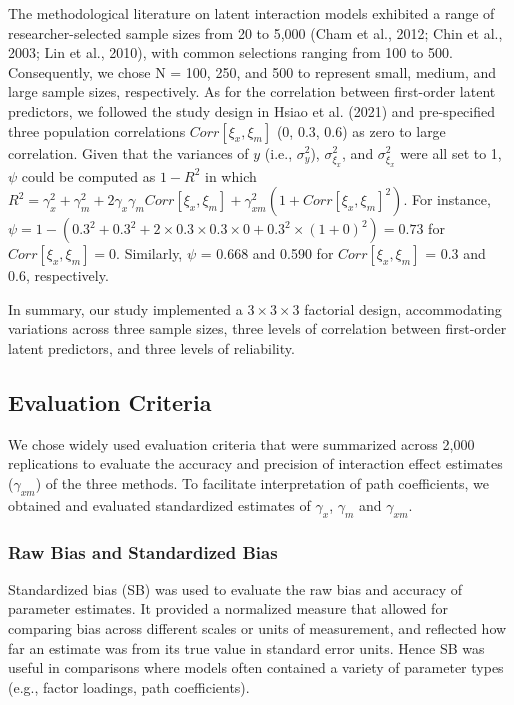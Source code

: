 \documentclass[
  man]{apa6}
\begin{document}
The methodological literature on latent interaction models exhibited a range of researcher-selected sample sizes from 20 to 5,000 (Cham et al., 2012; Chin et al., 2003; Lin et al., 2010), with common selections ranging from 100 to 500. Consequently, we chose N = 100, 250, and 500 to represent small, medium, and large sample sizes, respectively. As for the correlation between first-order latent predictors, we followed the study design in Hsiao et al. (2021) and pre-specified three population correlations \(Corr[{\xi_{x},\xi_{m}}]\) (0, 0.3, 0.6) as zero to large correlation. Given that the variances of \(y\) (i.e., \(\sigma_{y}^2\)), \(\sigma_{\xi_{x}}^2\), and \(\sigma_{\xi_{x}}^2\) were all set to 1, \(\psi\) could be computed as \(1 - R^2\) in which \(R^2 = \gamma_{x}^2 + \gamma_{m}^2 + 2\gamma_{x}\gamma_{m}Corr[{\xi_{x},\xi_{m}}] + \gamma_{xm}^2(1 + Corr[{\xi_{x},\xi_{m}}]^2)\). For instance, \(\psi = 1 - (0.3^2 + 0.3^2 + 2\times0.3\times0.3\times0 + 0.3^2\times(1 + 0)^2) = 0.73\) for \(Corr[{\xi_{x},\xi_{m}}] = 0\). Similarly, \(\psi\) = 0.668 and 0.590 for \(Corr[{\xi_{x},\xi_{m}}]\) = 0.3 and 0.6, respectively.

In summary, our study implemented a \(3 \times 3 \times 3\) factorial design, accommodating variations across three sample sizes, three levels of correlation between first-order latent predictors, and three levels of reliability.

\hypertarget{evaluation-criteria}{%
\subsection{Evaluation Criteria}\label{evaluation-criteria}}

We chose widely used evaluation criteria that were summarized across 2,000 replications to evaluate the accuracy and precision of interaction effect estimates (\(\gamma_{xm}\)) of the three methods. To facilitate interpretation of path coefficients, we obtained and evaluated standardized estimates of \(\gamma_{x}\), \(\gamma_{m}\) and \(\gamma_{xm}\).

\hypertarget{raw-bias-and-standardized-bias}{%
\subsubsection{Raw Bias and Standardized Bias}\label{raw-bias-and-standardized-bias}}

Standardized bias (SB) was used to evaluate the raw bias and accuracy of parameter estimates. It provided a normalized measure that allowed for comparing bias across different scales or units of measurement, and reflected how far an estimate was from its true value in standard error units. Hence SB was useful in comparisons where models often contained a variety of parameter types (e.g., factor loadings, path coefficients).
\end{document}
